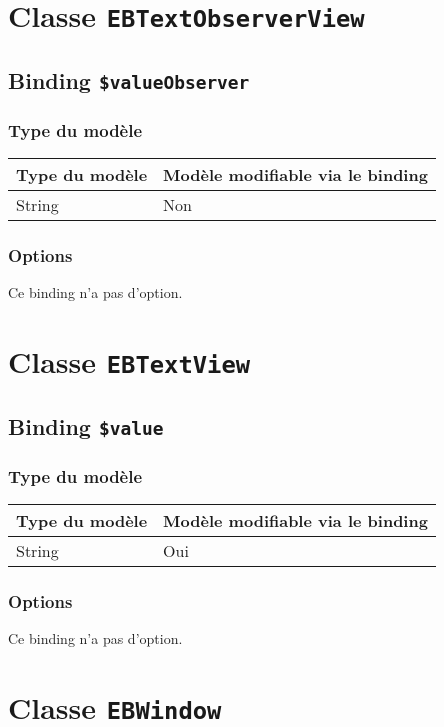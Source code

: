 \section{Classe \texttt{EBTextObserverView}}

\subsection{Binding \texttt{\$valueObserver}}

\subsubsection{Type du modèle}

\begin{tabular}{|l|l|}
\hline
\textbf{Type du modèle} & \textbf{Modèle modifiable via le binding}\\
\hline
String & Non\\
\hline
\end{tabular}
\subsubsection{Options}

Ce binding n'a pas d'option.








\section{Classe \texttt{EBTextView}}

\subsection{Binding \texttt{\$value}}

\subsubsection{Type du modèle}

\begin{tabular}{|l|l|}
\hline
\textbf{Type du modèle} & \textbf{Modèle modifiable via le binding}\\
\hline
String & Oui\\
\hline
\end{tabular}
\subsubsection{Options}

Ce binding n'a pas d'option.








\section{Classe \texttt{EBWindow}}








